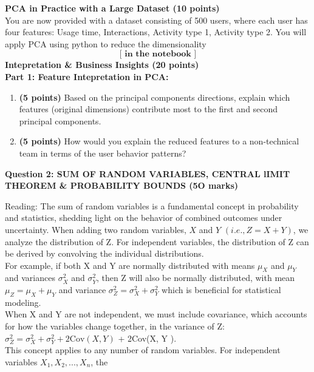\documentclass[a3paper,12pt]{extarticle} %
\begin{document}
\begin{enumerate}
\begin{enumerate}
\[        \]
    \end{enumerate}
    \subitem \textbf{PCA in Practice with a Large Dataset (10 points)} 
    \\ You are now provided with a dataset consisting of 500 users, where each user has four features: Usage time, Interactions, Activity type 1, Activity type 2. You will apply PCA using python to reduce the dimensionality
    \[
     \textbf{[ in the notebook ]}
    \]
    \subitem \textbf{Intepretation \& Business Insights (20 points)}
    \\ \subitem \textbf{Part 1: Feature Intepretation in PCA:}
    \begin{enumerate}
        \item \textbf{(5 points)} Based on the principal components directions, explain which features (original dimensions) contribute most to the first and second principal components.
        \[
        \]
        \item \textbf{(5 points)} How would you explain the reduced features to a non-technical team in terms of the user behavior patterns?
    \end{enumerate}
\end{enumerate}
\newpage
\begin{center}
    \large \textbf{Question 2: SUM OF RANDOM VARIABLES, CENTRAL lIMIT THEOREM \& PROBABILITY BOUNDS (5O marks)}
\end{center}
    Reading: The sum of random variables is a fundamental concept in probability and statistics, shedding
    light on the behavior of combined outcomes under uncertainty. When adding two random variables, \(X\)
    and \(Y\) \((i.e., Z = X + Y )\), we analyze the distribution of Z. For independent variables, the distribution
    of Z can be derived by convolving the individual distributions.
    \\ For example, if both X and Y are normally distributed with means \(\mu_X\) and \(\mu_Y\) and variances \(\sigma^2_X\) and \(\sigma^2_Y\), then Z will also be normally distributed, with mean \(\mu_Z = \mu_X + \mu_Y\) and variance \(\sigma^2_Z = \sigma^2_X + \sigma^2_Y\)
    which is beneficial for statistical modeling.
    \\ When X and Y are not independent, we must include covariance, which accounts for how the variables
    change together, in the variance of Z: \(\sigma^2_Z = \sigma^2_X + \sigma^2_Y + 2\text{Cov}(X, Y)\)
    + 2Cov(X, Y ).
    \\ This concept applies to any number of random variables. For independent variables \(X_1,X_2, . . . ,X_n\), the
\end{document}

